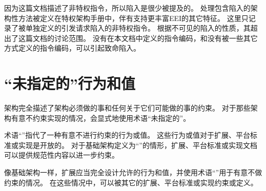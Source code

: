 因为这篇文档描述了非特权指令，所以陷入是很少被提及的。
处理包含陷入的架构性方法被定义在特权架构手册中，伴有支持更丰富EEI的其它特征。
这里只记录了被单独定义的引发请求陷入的非特权指令。
根据不可见的陷入的性质，其超出了这篇文档的讨论范围。
没有在本文档中定义的指令编码，和没有被一些其它方式定义的指令编码，可以引起致命陷入。

\section{“未指定的”行为和值}

架构完全描述了架构必须做的事和任何关于它们可能做的事的约束。
对于那些架构有意不约束实现的情况，会显式地使用术语“\textsc{未指定的}”。

术语“\unspecified”指代了一种有意不进行约束的行为或值。
这些行为或值对于扩展、平台标准或实现是开放的。
对于基础架构定义为“\unspecified”的情形，扩展、平台标准或实现文档可以提供规范性内容以进一步约束。

像基础架构一样，扩展应当完全设计允许的行为和值，并使用术语“\unspecified”用于有意不做约束的情况。
在这些情况中，可以被其它的扩展、平台标准或实现约束或定义。
